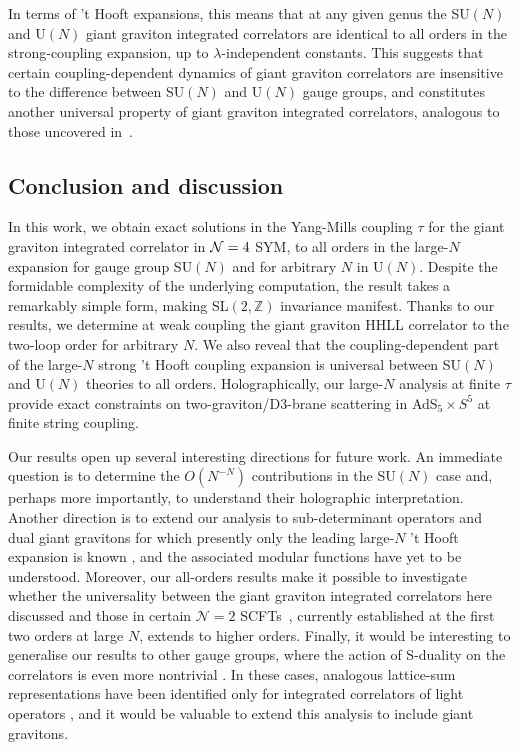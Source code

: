 \documentclass[aps,prl,twocolumn, longbibliography,footinbib,superscriptaddress, preprintnumbers]{revtex4-1}
\newcommand{\<}{\langle}
\renewcommand{\>}{\rangle}
\def\cN{{\cal N}}
\begin{document}
In terms of 't Hooft expansions, this means that at any given genus the SU$(N)$ and U$(N)$ giant graviton integrated correlators are identical to all orders in the strong-coupling expansion, up to $\lambda$-independent constants. This suggests that certain coupling-dependent dynamics of giant graviton correlators are insensitive to the difference between SU$(N)$ and U$(N)$ gauge groups, and constitutes another universal property of giant graviton integrated correlators, analogous to those uncovered in~\cite{Brown:2025huy, DeLillo:2025stg}.

\vspace{-0.6cm}
\subsection{Conclusion and discussion}
\vspace{-0.3cm}

In this work, we obtain exact solutions in the Yang-Mills coupling $\tau$ for the giant graviton integrated correlator in $\cN=4$ SYM, to all orders in the large-$N$ expansion for gauge group SU$(N)$ and for arbitrary $N$ in U$(N)$. Despite the formidable complexity of the underlying computation, the result takes a remarkably simple form, making SL$(2,\mathbb{Z})$
invariance manifest.
Thanks to our results, we determine at weak coupling the giant graviton HHLL correlator to the two-loop order for arbitrary $N$.
We also reveal that the coupling-dependent part of the large-$N$ strong 't Hooft coupling expansion is universal between SU$(N)$ and U$(N)$ theories to all orders. Holographically, our large-$N$ analysis at finite $\tau$ provide exact constraints on two-graviton/D3-brane scattering in AdS$_5 \times S^5$ at finite string coupling.

Our results open up several interesting directions for future work. An immediate question is to determine the $O(N^{-N})$ contributions in the SU$(N)$ case and, perhaps more importantly, to understand their holographic interpretation. Another direction is to extend our analysis to sub-determinant operators and dual giant gravitons for which presently only the leading large-$N$ ’t Hooft expansion is known \cite{Brown:2025huy}, and the associated modular functions have yet to be understood. Moreover, our all-orders results make it possible to investigate whether the universality between the giant graviton integrated correlators here discussed and those in certain $\mathcal{N}=2$ SCFTs~\cite{DeLillo:2025stg, Chester:2025ssu}, currently established at the first two orders at large $N$, extends to higher orders. Finally, it would be interesting to generalise our results to other gauge groups, where the action of S-duality on the correlators is even more nontrivial \cite{Goddard:1976qe}. In these cases, analogous lattice-sum representations have been identified only for integrated correlators of light operators \cite{Dorigoni:2022zcr, Dorigoni:2023ezg}, and it would be valuable to extend this analysis to include giant gravitons.
\end{document}
